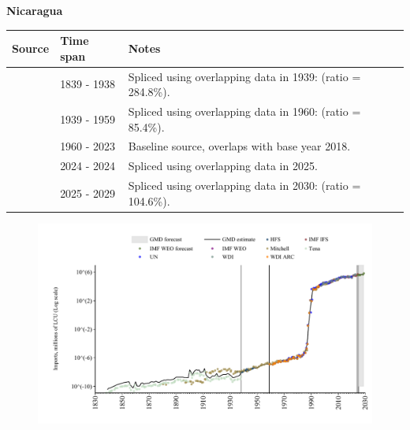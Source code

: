 \documentclass[12pt,a4paper,landscape]{article}
\begin{document}
\begin{adjustbox}{max totalsize={\paperwidth}{\paperheight},center}
\begin{minipage}[t][\textheight][t]{\textwidth}
\vspace*{0.5cm}
{}
\begin{center}
{\Large\bfseries Nicaragua}
\end{center}
\vspace{0.5cm}
\begin{table}[H]
\centering
\small
\begin{tabular}{|l|l|l|}
\hline
\textbf{Source} & \textbf{Time span} & \textbf{Notes} \\
\hline
\rowcolor{white}\cite{Tena}& 1839 - 1938 &Spliced using overlapping data in 1939: (ratio = 284.8\%).\\
\rowcolor{lightgray}\cite{Mitchell}& 1939 - 1959 &Spliced using overlapping data in 1960: (ratio = 85.4\%).\\
\rowcolor{white}\cite{WDI}& 1960 - 2023 &Baseline source, overlaps with base year 2018.\\
\rowcolor{lightgray}\cite{IMF_IFS}& 2024 - 2024 &Spliced using overlapping data in 2025.\\
\rowcolor{white}\cite{IMF_WEO_forecast}& 2025 - 2029 &Spliced using overlapping data in 2030: (ratio = 104.6\%).\\
\hline
\end{tabular}
\end{table}
\begin{figure}[H]
\centering
\includegraphics[width=\textwidth,height=0.6\textheight,keepaspectratio]{graphs/NIC_imports.pdf}
\end{figure}
\end{minipage}
\end{adjustbox}
\end{document}
